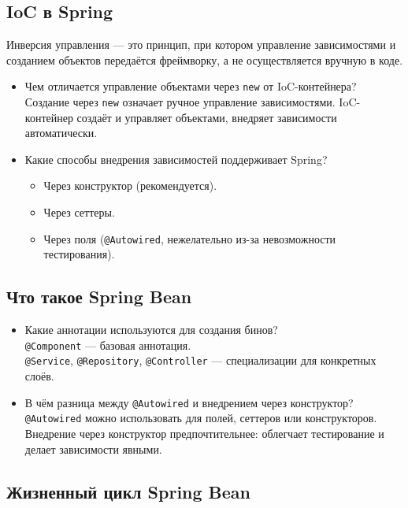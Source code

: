 \documentclass[a4paper,14pt]{article}
\begin{document}
\subsection{IoC в Spring}
Инверсия управления — это принцип, при котором управление зависимостями и созданием объектов передаётся фреймворку, а не осуществляется вручную в коде.
\begin{itemize}
\item Чем отличается управление объектами через \texttt{new} от IoC-контейнера? \\
Создание через \texttt{new} означает ручное управление зависимостями. IoC-контейнер создаёт и управляет объектами, внедряет зависимости автоматически.

\item Какие способы внедрения зависимостей поддерживает Spring? \\
\begin{itemize}
\item Через конструктор (рекомендуется).
\item Через сеттеры.
\item Через поля (\texttt{@Autowired}, нежелательно из-за невозможности тестирования).
\end{itemize}
\end{itemize}

\subsection{Что такое Spring Bean}

\begin{itemize}
\item Какие аннотации используются для создания бинов? \\
\texttt{@Component} — базовая аннотация. \\
\texttt{@Service}, \texttt{@Repository}, \texttt{@Controller} — специализации для конкретных слоёв.

\item В чём разница между \texttt{@Autowired} и внедрением через конструктор? \\
\texttt{@Autowired} можно использовать для полей, сеттеров или конструкторов. Внедрение через конструктор предпочтительнее: облегчает тестирование и делает зависимости явными.
\end{itemize}

\subsection{Жизненный цикл Spring Bean}
\end{document}
